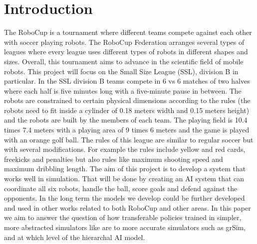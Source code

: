 \section{Introduction}
\label{section:intro}

The RoboCup \cite{RoboCupSSL} is a tournament where different teams compete against each other with soccer playing robots. The RoboCup Federation arranges several types of leagues where every league uses different types of robots in different shapes and sizes. Overall, this tournament aims to advance in the scientific field of mobile robots. 
This project will focus on the Small Size League (SSL), division B in particular. In the SSL division B teams compete in 6 vs 6 matches of two halves where each half is five minutes long with a five-minute pause in between. The robots are constrained to certain physical dimensions according to the rules (the robots need to fit inside a cylinder of 0.18 meters width and 0.15 meters height) and the robots are built by the members of each team. The playing field is 10.4 times 7.4 meters with a playing area of 9 times 6 meters and the game is played with an orange golf ball. The rules of this league are similar to regular soccer but with several modifications. For example the rules include yellow and red cards, freekicks and penalties but also rules like maximum shooting speed and maximum dribbling length. 
The aim of this project is to develop a system that works well in simulation. That will be done by creating an AI system that can coordinate all six robots, handle the ball, score goals and defend against the opponents. In the long term the models we develop could be further developed and used in other works related to both RoboCup and other areas. In this paper we aim to answer the question of how transferable policies trained in simpler, more abstracted simulators like  are to more accurate simulators such as grSim, and at which level of the hierarchal AI model.
